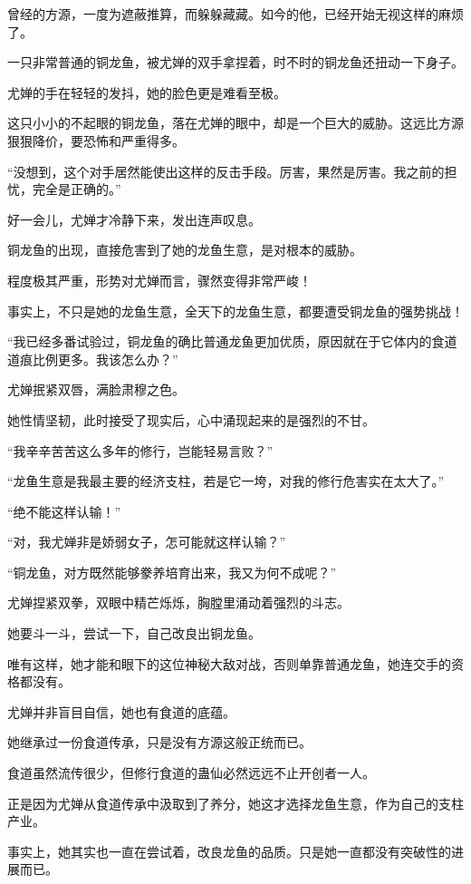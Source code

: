 \begin{this_body}
曾经的方源，一度为遮蔽推算，而躲躲藏藏。如今的他，已经开始无视这样的麻烦了。

一只非常普通的铜龙鱼，被尤婵的双手拿捏着，时不时的铜龙鱼还扭动一下身子。

尤婵的手在轻轻的发抖，她的脸色更是难看至极。

这只小小的不起眼的铜龙鱼，落在尤婵的眼中，却是一个巨大的威胁。这远比方源狠狠降价，要恐怖和严重得多。

“没想到，这个对手居然能使出这样的反击手段。厉害，果然是厉害。我之前的担忧，完全是正确的。”

好一会儿，尤婵才冷静下来，发出连声叹息。

铜龙鱼的出现，直接危害到了她的龙鱼生意，是对根本的威胁。

程度极其严重，形势对尤婵而言，骤然变得非常严峻！

事实上，不只是她的龙鱼生意，全天下的龙鱼生意，都要遭受铜龙鱼的强势挑战！

“我已经多番试验过，铜龙鱼的确比普通龙鱼更加优质，原因就在于它体内的食道道痕比例更多。我该怎么办？”

尤婵抿紧双唇，满脸肃穆之色。

她性情坚韧，此时接受了现实后，心中涌现起来的是强烈的不甘。

“我辛辛苦苦这么多年的修行，岂能轻易言败？”

“龙鱼生意是我最主要的经济支柱，若是它一垮，对我的修行危害实在太大了。”

“绝不能这样认输！”

“对，我尤婵非是娇弱女子，怎可能就这样认输？”

“铜龙鱼，对方既然能够豢养培育出来，我又为何不成呢？”

尤婵捏紧双拳，双眼中精芒烁烁，胸膛里涌动着强烈的斗志。

她要斗一斗，尝试一下，自己改良出铜龙鱼。

唯有这样，她才能和眼下的这位神秘大敌对战，否则单靠普通龙鱼，她连交手的资格都没有。

尤婵并非盲目自信，她也有食道的底蕴。

她继承过一份食道传承，只是没有方源这般正统而已。

食道虽然流传很少，但修行食道的蛊仙必然远远不止开创者一人。

正是因为尤婵从食道传承中汲取到了养分，她这才选择龙鱼生意，作为自己的支柱产业。

事实上，她其实也一直在尝试着，改良龙鱼的品质。只是她一直都没有突破性的进展而已。


\end{this_body}
